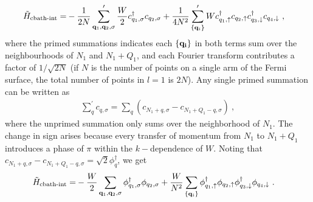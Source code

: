 \begin{equation}\begin{aligned}
	\tilde H_\text{cbath-int} =& -\frac{1}{2N}\sum^\prime_{{\bf q}_1, {\bf q}_2,\sigma}\frac{W}{2}c^\dagger_{q_1,\sigma}c_{q_2,\sigma} + \frac{1}{4N^2}\sum^\prime_{\{{\bf q}_i\}}Wc^\dagger_{q_1,\uparrow}c_{q_2,\uparrow}c^\dagger_{q_3,\downarrow}c_{q_4,\downarrow}~,
\end{aligned}\end{equation}
where the primed summations indicates each \(\{\bf q_i\}\) in both terms sum over the neighbourhoods of \(N_1\) and \(N_1+Q_1\), and each Fourier transform contributes a factor of \(1/\sqrt{2N}\) (if \(N\) is the number of points on a single arm of the Fermi surface, the total number of points in \(l=1\) is \(2N\)). Any single primed summation can be written as
\begin{equation}\begin{aligned}
	\sum^\prime_{q}c_{q,\sigma} = \sum_{q}\left(c_{N_1 + q,\sigma} - c_{N_1 + Q_1 - q,\sigma}\right)~,
\end{aligned}\end{equation}
where the unprimed summation only sums over the neighborhood of \(N_1\). The change in sign arises because every transfer of momentum from \(N_1\) to \(N_1 + Q_1\) introduces a phase of \(\pi\) within the \(k-\)dependence of \(W\). Noting that \(c_{N_1 + q,\sigma} - c_{N_1 + Q_1 - q,\sigma} = \sqrt 2 \phi^\dagger_q\), we get
\begin{equation}\begin{aligned}
	\tilde H_\text{cbath-int} =& -\frac{W}{2}\sum_{{\bf q}_1, {\bf q}_2,\sigma}\phi^\dagger_{q_1,\sigma}\phi_{q_2,\sigma} + \frac{W}{N^2}\sum_{\{{\bf q}_i\}}\phi^\dagger_{q_1,\uparrow}\phi_{q_2,\uparrow}\phi^\dagger_{q_3,\downarrow}\phi_{q_4,\downarrow}~.
\end{aligned}\end{equation}

